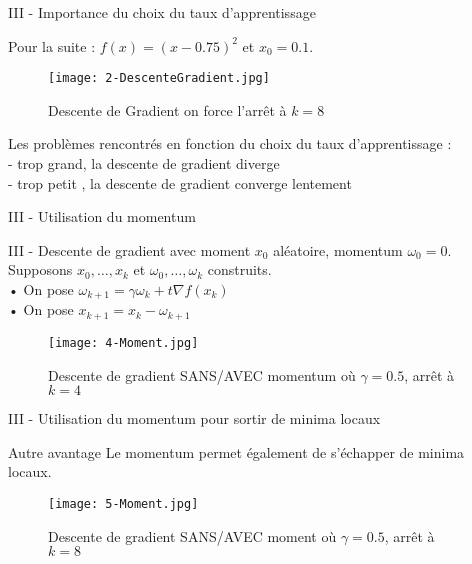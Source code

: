 \begin{frame}{III - Importance du choix du taux d'apprentissage}
    \begin{exampleblock}{}
        Pour la suite : $f(x) = (x-0.75)^2$ et $x_0=0.1$. \\
    \end{exampleblock}
    \begin{figure}
        \centering
        \texttt{[image: 2-DescenteGradient.jpg]}
        \caption{Descente de Gradient on force l'arrêt à $k=8$}
    \end{figure}
    \begin{alertblock}{}
        Les problèmes rencontrés en fonction du choix du taux d'apprentissage : \\
        - trop grand, la descente de gradient diverge \\
        - trop petit , la descente de gradient converge lentement \\
    \end{alertblock}
\end{frame}


\begin{frame}{III - Utilisation du momentum}
    \begin{block}{III - Descente de gradient avec moment}
        $x_0$ aléatoire, momentum $\omega_0 = 0$.
        Supposons $x_0, \ldots, x_k$ et $\omega_0, \ldots, \omega_k$ construits. \\
        • On pose $\omega_{k+1} = \gamma \omega_k + t \nabla f(x_k)$ \\
        • On pose $x_{k+1} = x_k - \omega_{k+1}$
    \end{block}
    \begin{figure}
        \centering
        \texttt{[image: 4-Moment.jpg]}
        \caption{Descente de gradient SANS/AVEC momentum où $\gamma = 0.5$, arrêt à $k=4$}
    \end{figure}
\end{frame}


\begin{frame}{III - Utilisation du momentum pour sortir de minima locaux}
    \begin{exampleblock}{Autre avantage}
        Le momentum permet également de s'échapper de minima locaux.        
    \end{exampleblock}
    \begin{figure}
        \centering
        \texttt{[image: 5-Moment.jpg]}
        \caption{Descente de gradient SANS/AVEC moment où $\gamma = 0.5$, arrêt à $k=8$}
    \end{figure}
\end{frame}

